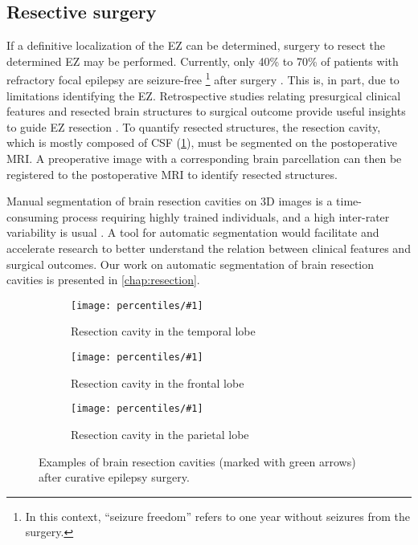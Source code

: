 \subsection{Resective surgery}

If a definitive localization of the \ac{EZ} can be determined, surgery to resect the determined \ac{EZ} may be performed.
Currently, only 40\% to 70\% of patients with refractory focal epilepsy are seizure-free%
\footnote{In this context, ``seizure freedom'' refers to one year without seizures from the surgery.}
after surgery \cite{jobst_resective_2015}.
This is, in part, due to limitations identifying the \ac{EZ}.
Retrospective studies relating presurgical clinical features and resected brain structures to surgical outcome provide useful insights to guide \ac{EZ} resection \cite{jobst_resective_2015}.
To quantify resected structures, the resection cavity, which is mostly composed of \ac{CSF} (\cref{fig:cavities}), must be segmented on the postoperative \ac{MRI}.
A preoperative image with a corresponding brain parcellation can then be registered to the postoperative \ac{MRI} to identify resected structures.

Manual segmentation of brain resection cavities on 3D images is a time-consuming process requiring highly trained individuals, and a high inter-rater variability is usual \cite{havaei_brain_2017}.
A tool for automatic segmentation would facilitate and accelerate research to better understand the relation between clinical features and surgical outcomes.
Our work on automatic segmentation of brain resection cavities is presented in \cref{chap:resection}.


\newcommand{\plotcavities}[2]{
  \begin{subfigure}{0.8\linewidth}
    \texttt{[image: percentiles/\#1]}
    \caption{#2}
  \end{subfigure}
}

\begin{figure}
  \centering

  \plotcavities{p_050_0185_arrows}{Resection cavity in the temporal lobe}
  \plotcavities{p_075_1263_arrows}{Resection cavity in the frontal lobe}
  \plotcavities{p_025_0039_arrows}{Resection cavity in the parietal lobe}

  \caption[Examples of brain resection cavities after curative epilepsy surgery.]{
    Examples of brain resection cavities (marked with green arrows) after curative epilepsy surgery.
  }
  \label{fig:cavities}
\end{figure}
